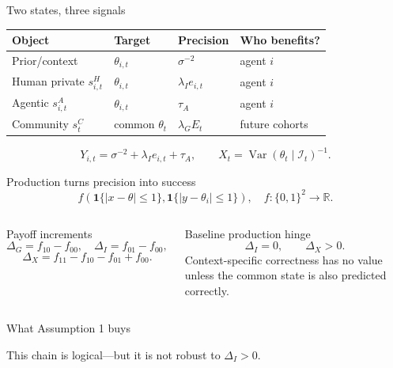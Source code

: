 \documentclass[aspectratio=169,10pt]{beamer}
\begin{document}
\begin{frame}{Two states, three signals}
\small
\begin{tabular}{@{}llll@{}}\toprule
Object & Target & Precision & Who benefits?\\\midrule
Prior/context & $\theta_{i,t}$ & $\sigma^{-2}$ & agent $i$\\
Human private $s^H_{i,t}$ & $\theta_{i,t}$ & $\lambda_Ie_{i,t}$ & agent $i$\\
Agentic $s^A_{i,t}$ & $\theta_{i,t}$ & $\tau_A$ & agent $i$\\
Community $s^C_t$ & common $\theta_t$ & $\lambda_GE_t$ & future cohorts\\\bottomrule
\end{tabular}
\vspace{.45cm}
\[
Y_{i,t}=\sigma^{-2}+\lambda_Ie_{i,t}+\tau_A,\qquad X_t=\operatorname{Var}(\theta_t\mid\mathcal I_t)^{-1}.
\]
\end{frame}

\begin{frame}{Production turns precision into success}
\small
\[
f\!\left(\mathbf 1\{|x-\theta|\le1\},\mathbf 1\{|y-\theta_i|\le1\}\right),
\quad f:\{0,1\}^2\to\mathbb R.
\]
\begin{columns}[T,onlytextwidth]
\begin{block}{Payoff increments}
\[
\Delta_G=f_{10}-f_{00},\quad \Delta_I=f_{01}-f_{00},
\]
\[
\Delta_X=f_{11}-f_{10}-f_{01}+f_{00}.
\]
\end{block}
\begin{alertblock}{Baseline production hinge}
\[
\Delta_I=0,\qquad \Delta_X>0.
\]
Context-specific correctness has no value unless the common state is also predicted correctly.
\end{alertblock}
\end{columns}
\end{frame}

\begin{frame}{What Assumption 1 buys}
\begin{center}
\end{center}
\vspace{.45cm}\Large\centering This chain is logical—but it is not robust to $\Delta_I>0$.
\end{frame}
\end{document}
